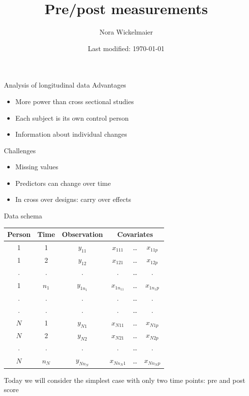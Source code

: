 \documentclass[aspectratio=169]{beamer}
\title{Pre/post measurements}
\author{Nora Wickelmaier}
\date{Last modified: \today}
\begin{document}
\begin{frame}{}
\thispagestyle{empty}
\titlepage
\end{frame}

\begin{frame}{Analysis of longitudinal data}
Advantages

\begin{itemize}
\item More power than cross sectional studies
\item Each subject is its own control person
\item Information about individual changes
\end{itemize}

Challenges
\begin{itemize}
\item Missing values
\item Predictors can change over time
\item In cross over designs: carry over effects
\end{itemize}
\end{frame}

\begin{frame}{Data schema}
\vfill
\begin{center}
\begin{tabular}{cccccc}
\hline
Person & Time      & Observation & \multicolumn{3}{c}{Covariates}\\\hline
1      & 1         & $y_{11}$    & $x_{111}$   & \dots & $x_{11p}$  \\
1      & 2         & $y_{12}$    & $x_{121}$   & \dots & $x_{12p}$  \\
.      & .         & .           & .           & \dots & .          \\
1      & $n_1$     & $y_{1n_1}$  & $x_{1n_11}$ & \dots & $x_{1n_1p}$\\
.      & .         & .           & .           & \dots & .          \\
.      & .         & .           & .           & \dots & .          \\
$N$    & 1         & $y_{N1}$    & $x_{N11}$   & \dots & $x_{N1p}$  \\
$N$    & 2         & $y_{N2}$    & $x_{N21}$   & \dots & $x_{N2p}$  \\
.      & .         & .           & .           & \dots & .          \\
$N$    & $n_N$     & $y_{Nn_N}$  & $x_{Nn_N1}$ & \dots & $x_{Nn_Np}$\\
\hline
\end{tabular}
\end{center}
\vfill
\pause
Today we will consider the simplest case with only two time points: pre and post
score
\end{frame}
\end{document}
